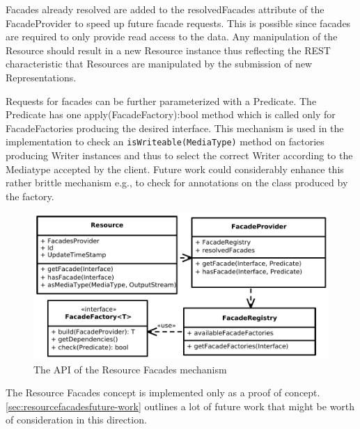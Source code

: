 \documentclass[12pt,a4paper,twoside]{scrartcl}		%
\begin{document}
Facades already resolved are added to the resolvedFacades attribute of the
FacadeProvider to speed up future facade requests. This is possible since
facades are required to only provide read access to the data. Any manipulation
of the Resource should result in a new Resource instance thus reflecting the
REST characteristic that Resources are manipulated by the submission of new
Representations.

Requests for facades can be further parameterized with a Predicate. The
Predicate has one apply(FacadeFactory):bool method which is called only for
FacadeFactories producing the desired interface. This mechanism is used in the
implementation to check an \lstinline:isWriteable(MediaType): method on
factories producing Writer instances and thus to select the correct Writer
according to the Mediatype accepted by the client. Future work could
considerably enhance this rather brittle mechanism e.g., to check for
annotations on the class produced by the factory.

\begin{figure}[htb]
  \centering
  \includegraphics[width=1\textwidth]{resourcefacades}

  \caption{The API of the Resource Facades mechanism}
  \label{fig:resourcefacades}
\end{figure}

The Resource Facades concept is implemented only as a proof of
concept. \autoref{sec:resourcefacadesfuture-work} outlines a lot of future work
that might be worth of consideration in this direction.


\end{document}
